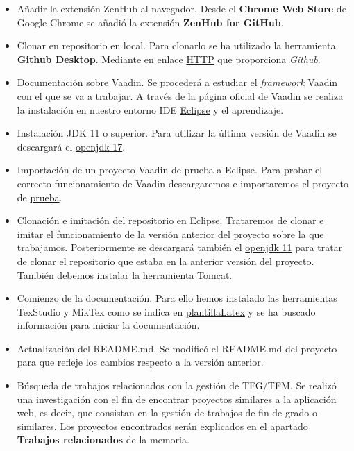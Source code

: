 \begin{itemize}
	
	\item Añadir la extensión ZenHub al navegador. 
	Desde el \textbf{Chrome Web Store} de Google Chrome se añadió la extensión \textbf{ZenHub for GitHub}.
	
	\item Clonar en repositorio en local. Para clonarlo se ha utilizado la herramienta \textbf{Github Desktop}. Mediante en enlace \href{https://github.com/drg1006/Gestor-TFG-2022.git}{HTTP} que proporciona \emph{Github}.
	
	\item Documentación sobre Vaadin. Se procederá a estudiar el \emph{framework} Vaadin con el que se va a trabajar. A través de la página oficial de \href{https://vaadin.com/}{Vaadin} se realiza la instalación en nuestro entorno IDE \href{https://www.eclipse.org/ide/}{Eclipse} y el aprendizaje.
	
	\item Instalación JDK 11 o superior. Para utilizar la última versión de Vaadin se descargará el  \href{https://www.oracle.com/java/technologies/downloads/#jdk17-windows}{openjdk 17}. 
	
	\item Importación de un proyecto Vaadin de prueba a Eclipse. Para probar el correcto funcionamiento de Vaadin descargaremos e importaremos el proyecto de \href{https://vaadin.com/docs/latest/guide/quick-start}{prueba}.
	
	\item Clonación e imitación del repositorio en Eclipse. Trataremos de clonar e imitar el funcionamiento de la versión \href{https://github.com/dbo1001/Gestor-TFG-2021}{anterior del proyecto} sobre la que trabajamos.
	Posteriormente se descargará también el \href{https://www.oracle.com/java/technologies/downloads/#java11-windows}{openjdk 11} para tratar de clonar el repositorio que estaba en la anterior versión del proyecto. También debemos instalar la herramienta \href{https://tomcat.apache.org/}{Tomcat}.
	
	\item Comienzo de la documentación. Para ello hemos instalado las herramientas TexStudio y MikTex como se indica en \href{https://github.com/ubutfgm/plantillaLatex}{plantillaLatex} y se ha buscado información para iniciar la documentación.
	
	\item Actualización del README.md. 
	Se modificó el README.md del proyecto para que refleje los cambios respecto a la versión anterior. 
	
	\item Búsqueda de trabajos relacionados con la gestión de TFG/TFM.
	Se realizó una investigación con el fin de encontrar proyectos similares a la aplicación web, es decir, que consistan en la gestión de trabajos de fin de grado o similares. Los proyectos encontrados serán explicados en el apartado \textbf{Trabajos relacionados} de la memoria.
\end{itemize}

